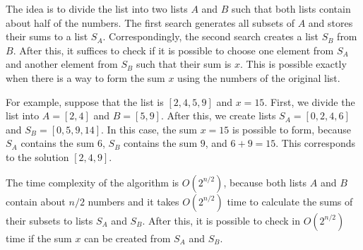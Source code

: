 The idea is to divide the list into
two lists $A$ and $B$ such that both
lists contain about half of the numbers.
The first search generates all subsets
of $A$ and stores their sums to a list $S_A$.
Correspondingly, the second search creates
a list $S_B$ from $B$.
After this, it suffices to check if it is possible
to choose one element from $S_A$ and another
element from $S_B$ such that their sum is $x$.
This is possible exactly when there is a way to
form the sum $x$ using the numbers of the original list.

For example, suppose that the list is $[2,4,5,9]$ and $x=15$.
First, we divide the list into $A=[2,4]$ and $B=[5,9]$.
After this, we create lists
$S_A=[0,2,4,6]$ and $S_B=[0,5,9,14]$.
In this case, the sum $x=15$ is possible to form,
because $S_A$ contains the sum $6$,
$S_B$ contains the sum $9$, and $6+9=15$.
This corresponds to the solution $[2,4,9]$.

The time complexity of the algorithm is $O(2^{n/2})$,
because both lists $A$ and $B$ contain about $n/2$ numbers
and it takes $O(2^{n/2})$ time to calculate the sums of
their subsets to lists $S_A$ and $S_B$.
After this, it is possible to check in 
$O(2^{n/2})$ time if the sum $x$ can be created
from $S_A$ and $S_B$.
